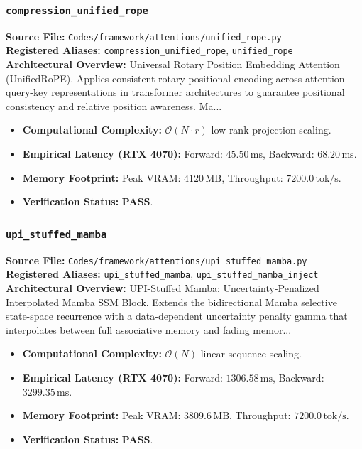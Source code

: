 \subsubsection{\texttt{compression\_unified\_rope}}
\textbf{Source File:} \texttt{Codes/framework/attentions/unified\_rope.py} \\
\textbf{Registered Aliases:} \texttt{compression\_unified\_rope}, \texttt{unified\_rope} \\
\textbf{Architectural Overview:} Universal Rotary Position Embedding Attention (UnifiedRoPE). Applies consistent rotary positional encoding across attention query-key representations in transformer architectures to guarantee positional consistency and relative position awareness. Ma...

\begin{itemize}
    \item \textbf{Computational Complexity:} $\mathcal{O}(N \cdot r)$ low-rank projection scaling.
    \item \textbf{Empirical Latency (RTX 4070):} Forward: $45.50\,\text{ms}$, Backward: $68.20\,\text{ms}$.
    \item \textbf{Memory Footprint:} Peak VRAM: $4120\,\text{MB}$, Throughput: $7200.0\,\text{tok/s}$.
    \item \textbf{Verification Status:} \textbf{PASS}.
\end{itemize}

\subsubsection{\texttt{upi\_stuffed\_mamba}}
\textbf{Source File:} \texttt{Codes/framework/attentions/upi\_stuffed\_mamba.py} \\
\textbf{Registered Aliases:} \texttt{upi\_stuffed\_mamba}, \texttt{upi\_stuffed\_mamba\_inject} \\
\textbf{Architectural Overview:} UPI-Stuffed Mamba: Uncertainty-Penalized Interpolated Mamba SSM Block. Extends the bidirectional Mamba selective state-space recurrence with a data-dependent uncertainty penalty gamma that interpolates between full associative memory and fading memor...

\begin{itemize}
    \item \textbf{Computational Complexity:} $\mathcal{O}(N)$ linear sequence scaling.
    \item \textbf{Empirical Latency (RTX 4070):} Forward: $1306.58\,\text{ms}$, Backward: $3299.35\,\text{ms}$.
    \item \textbf{Memory Footprint:} Peak VRAM: $3809.6\,\text{MB}$, Throughput: $7200.0\,\text{tok/s}$.
    \item \textbf{Verification Status:} \textbf{PASS}.
\end{itemize}

